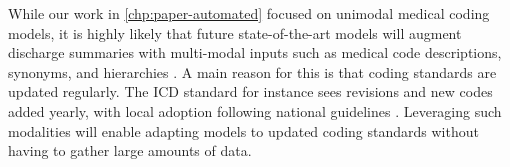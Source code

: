 While our work in \cref{chp:paper-automated} focused on unimodal medical coding models, it is highly likely that future state-of-the-art models will augment discharge summaries with multi-modal inputs such as medical code descriptions, synonyms, and hierarchies \parencite{kimReadAttendCode2021, mullenbachExplainablePredictionMedical2018, vuLabelAttentionModel2020, caoHyperCoreHyperbolicCograph2020, baoMedicalCodePrediction2021, yuanCodeSynonymsMatter2022,caoHyperCoreHyperbolicCograph2020, xieEHRCodingMultiscale2019}. 
A main reason for this is that coding standards are updated regularly. The ICD standard for instance sees revisions and new codes added yearly, with local adoption following national guidelines \parencite{centerfordiseasecontrolandpreventioncdc_international_2023}. 
Leveraging such modalities will enable adapting models to updated coding standards without having to gather large amounts of data. 







